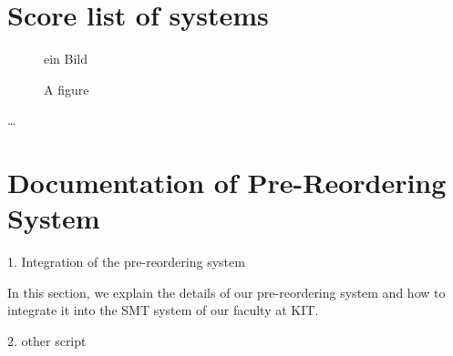 

\appendix

{}	%
{}	%




\section{Score list of systems}
		\label{Anhang-Implementierung}
		
\setcounter{figure}{0}
		
\begin{figure} [ht]
  \centering
   ein Bild
  \caption{A figure}
  \label{fig:BPMNBeispiela}
\end{figure}


\dots


\section{Documentation of Pre-Reordering System}
		\label{Documentation}

1. Integration of the pre-reordering system	
		
In this section, we explain the details of our pre-reordering system and how to integrate it into the SMT system of our faculty at KIT.


	
2. other script


